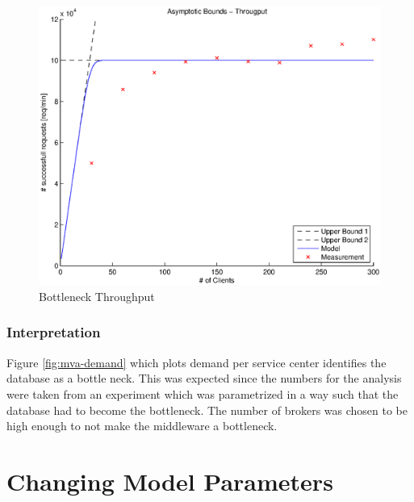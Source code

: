\documentclass[a4paper]{article}
\begin{document}



\begin{figure}[H]
	\begin{center}
    \includegraphics[scale=0.6]{../plots-ms2-mg/bottleneck-tp.eps}
  \end{center}
  \caption{Bottleneck Throughput}
  \label{fig:bottleneck-tp}
\end{figure}




\subsubsection{Interpretation}
Figure \ref{fig:mva-demand} which plots demand per service center identifies the database as a bottle neck. This was expected since the numbers for the analysis were taken from an experiment which was parametrized in a way such that the database had to become the bottleneck. The number of brokers was chosen to be high enough to not make the middleware a bottleneck.


\section{Changing Model Parameters}
\end{document}
